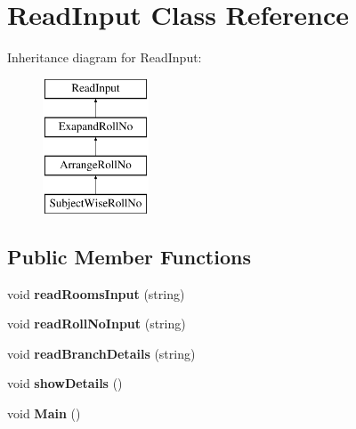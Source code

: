 \hypertarget{classReadInput}{\section{Read\-Input Class Reference}
\label{classReadInput}
}
Inheritance diagram for Read\-Input\-:\begin{figure}[H]
\begin{center}
\leavevmode
\includegraphics[height=4.000000cm]{classReadInput}
\end{center}
\end{figure}
\subsection*{Public Member Functions}
\begin{DoxyCompactItemize}
\item 
\hypertarget{classReadInput_a0376da89e28cfb2e24c5eb17cf3ad4d5}{void {\bfseries read\-Rooms\-Input} (string)}\label{classReadInput_a0376da89e28cfb2e24c5eb17cf3ad4d5}

\item 
\hypertarget{classReadInput_abb49a996b796f0f3d9d217f8074e990b}{void {\bfseries read\-Roll\-No\-Input} (string)}\label{classReadInput_abb49a996b796f0f3d9d217f8074e990b}

\item 
\hypertarget{classReadInput_a9fdbfb6fc49f6f372fac0ac81324be0c}{void {\bfseries read\-Branch\-Details} (string)}\label{classReadInput_a9fdbfb6fc49f6f372fac0ac81324be0c}

\item 
\hypertarget{classReadInput_a237bb5241a14226323f58213736ed0f8}{void {\bfseries show\-Details} ()}\label{classReadInput_a237bb5241a14226323f58213736ed0f8}

\item 
\hypertarget{classReadInput_afcb108a900b8424d0f74a4673fec7ca6}{void {\bfseries Main} ()}\label{classReadInput_afcb108a900b8424d0f74a4673fec7ca6}

\end{DoxyCompactItemize}
